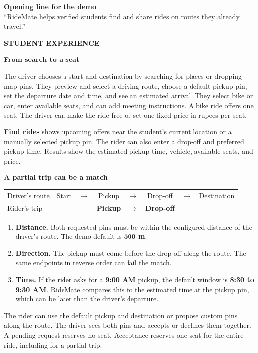 \documentclass[11pt,a4paper]{article}
\newcommand{\kicker}[1]{{\small\bfseries\textcolor{Pine}{\MakeUppercase{#1}}}\par}
\newcommand{\pageheading}[2]{%
  \pdfbookmark[0]{#2}{guide-page-\thepage}%
  \kicker{#1}%
  {\fontsize{31}{35}\selectfont\bfseries\textcolor{Ink}{#2}\par}%
  \vspace{2pt}%
}
\newcommand{\subhead}[1]{\par\addvspace{8pt}{\large\bfseries\textcolor{Pine}{#1}}\par\nopagebreak[4]}
\newcommand{\panel}[1]{%
  \par\noindent\colorbox{Wash}{\parbox{\dimexpr\linewidth-2\fboxsep\relax}{\setlength{\parskip}{4pt}#1}}\par
}
\begin{document}
\panel{\textbf{Opening line for the demo}\\
\textquotedblleft RideMate helps verified students find and share rides on routes they already travel.\textquotedblright}

\newpage
\pageheading{Student experience}{From search to a seat}

\subhead{Offer a ride}
The driver chooses a start and destination by searching for places or dropping map pins. They preview and select a driving route, choose a default pickup pin, set the departure date and time, and see an estimated arrival. They select bike or car, enter available seats, and can add meeting instructions. A bike ride offers one seat. The driver can make the ride free or set one fixed price in rupees per seat.

\subhead{Find a ride}
\textbf{Find rides} shows upcoming offers near the student's current location or a manually selected pickup pin. The rider can also enter a drop-off and preferred pickup time. Results show the estimated pickup time, vehicle, available seats, and price.

\panel{\textbf{A partial trip can be a match}\par
\setlength{\tabcolsep}{4pt}
\begin{tabular}{@{}lccccccc@{}}
Driver's route & Start & \(\rightarrow\) & Pickup & \(\rightarrow\) & Drop-off & \(\rightarrow\) & Destination \\
Rider's trip & & & \bfseries Pickup & \(\rightarrow\) & \bfseries Drop-off & & \\
\end{tabular}}

\subhead{What makes a match}
\begin{enumerate}
  \item \textbf{Distance.} Both requested pins must be within the configured distance of the driver's route. The demo default is \textbf{500 m}.
  \item \textbf{Direction.} The pickup must come before the drop-off along the route. The same endpoints in reverse order can fail the match.
  \item \textbf{Time.} If the rider asks for a \textbf{9:00 AM} pickup, the default window is \textbf{8:30 to 9:30 AM}. RideMate compares this to the estimated time at the pickup pin, which can be later than the driver's departure.
\end{enumerate}

\subhead{Request, review, and confirm}
The rider can use the default pickup and destination or propose custom pins along the route. The driver sees both pins and accepts or declines them together. A pending request reserves no seat. Acceptance reserves one seat for the entire ride, including for a partial trip.
\end{document}
